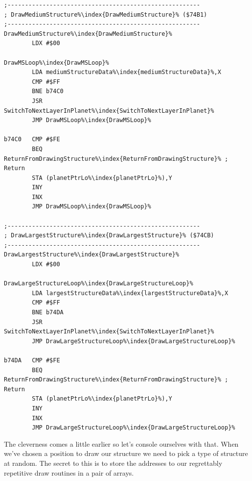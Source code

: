 \begin{lstlisting}[escapechar=\%,caption=\icode{DrawMediumStructure\index{DrawMediumStructure}} and \icode{DrawLargestStructure\index{DrawLargestStructure}} are identical to each other\, and to
\icode{DrawLittleStructure\index{DrawLittleStructure}} and \icode{DrawNextLargestStructure\index{DrawNextLargestStructure}}.]
;-------------------------------------------------------
; DrawMediumStructure%\index{DrawMediumStructure}% ($74B1)
;-------------------------------------------------------
DrawMediumStructure%\index{DrawMediumStructure}%
        LDX #$00

DrawMSLoop%\index{DrawMSLoop}%
        LDA mediumStructureData%\index{mediumStructureData}%,X
        CMP #$FF
        BNE b74C0
        JSR SwitchToNextLayerInPlanet%\index{SwitchToNextLayerInPlanet}%
        JMP DrawMSLoop%\index{DrawMSLoop}%

b74C0   CMP #$FE
        BEQ ReturnFromDrawingStructure%\index{ReturnFromDrawingStructure}% ; Return
        STA (planetPtrLo%\index{planetPtrLo}%),Y
        INY
        INX
        JMP DrawMSLoop%\index{DrawMSLoop}%

;-------------------------------------------------------
; DrawLargestStructure%\index{DrawLargestStructure}% ($74CB)
;-------------------------------------------------------
DrawLargestStructure%\index{DrawLargestStructure}%
        LDX #$00

DrawLargeStructureLoop%\index{DrawLargeStructureLoop}%
        LDA largestStructureData%\index{largestStructureData}%,X
        CMP #$FF
        BNE b74DA
        JSR SwitchToNextLayerInPlanet%\index{SwitchToNextLayerInPlanet}%
        JMP DrawLargeStructureLoop%\index{DrawLargeStructureLoop}%

b74DA   CMP #$FE
        BEQ ReturnFromDrawingStructure%\index{ReturnFromDrawingStructure}% ; Return
        STA (planetPtrLo%\index{planetPtrLo}%),Y
        INY
        INX
        JMP DrawLargeStructureLoop%\index{DrawLargeStructureLoop}%
\end{lstlisting}

The cleverness comes a little earlier so let's console ourselves with that. When we've chosen a position to draw
our structure we need to pick a type of structure at random. The secret to this is to store the addresses to our
regrettably repetitive draw routines in a pair of arrays. 


